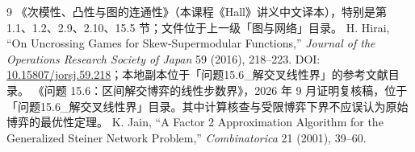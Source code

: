 \documentclass[UTF8,11pt,a4paper]{ctexart}
\begin{document}
\clearpage
\begin{thebibliography}{9}
 《次模性、凸性与图的连通性》（本课程《Hall》讲义中文译本），特别是第 1.1、1.2、2.9、2.10、15.5 节；文件位于上一级「图与网络」目录。
 H. Hirai, ``On Uncrossing Games for Skew-Supermodular Functions,'' \emph{Journal of the Operations Research Society of Japan} 59 (2016), 218--223. DOI: \href{https://doi.org/10.15807/jorsj.59.218}{10.15807/jorsj.59.218}；本地副本位于「问题15.6\_解交叉线性界」的参考文献目录。
 《问题 15.6：区间解交博弈的线性步数界》，2026 年 9 月证明复核稿，位于「问题15.6\_解交叉线性界」目录。其中计算核查与受限博弈下界不应误认为原始博弈的最优性定理。
 K. Jain, ``A Factor 2 Approximation Algorithm for the Generalized Steiner Network Problem,'' \emph{Combinatorica} 21 (2001), 39--60.
\end{thebibliography}
\end{document}
